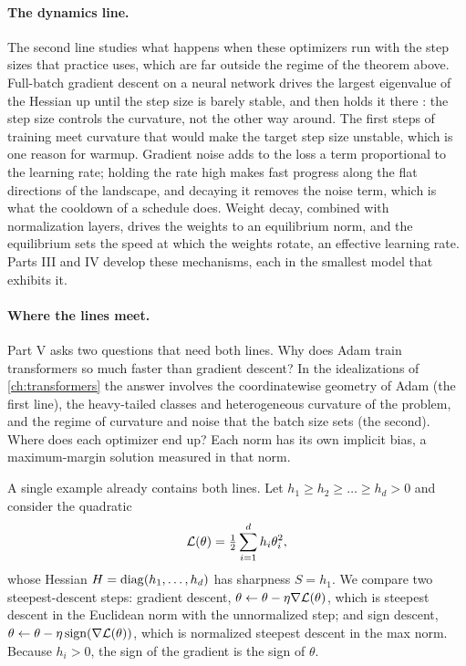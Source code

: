 \begin{refsection}
\paragraph{The dynamics line.} The second line studies what happens when these optimizers run with the step sizes that practice uses, which are far outside the regime of the theorem above. Full-batch gradient descent on a neural network drives the largest eigenvalue of the Hessian up until the step size is barely stable, and then holds it there \parencite{CohenEtAl2021}: the step size controls the curvature, not the other way around. The first steps of training meet curvature that would make the target step size unstable, which is one reason for warmup. Gradient noise adds to the loss a term proportional to the learning rate; holding the rate high makes fast progress along the flat directions of the landscape, and decaying it removes the noise term, which is what the cooldown of a schedule does. Weight decay, combined with normalization layers, drives the weights to an equilibrium norm, and the equilibrium sets the speed at which the weights rotate, an effective learning rate. Parts III and IV develop these mechanisms, each in the smallest model that exhibits it.

\paragraph{Where the lines meet.} Part V asks two questions that need both lines. Why does Adam train transformers so much faster than gradient descent? In the idealizations of \cref{ch:transformers} the answer involves the coordinatewise geometry of Adam (the first line), the heavy-tailed classes and heterogeneous curvature of the problem, and the regime of curvature and noise that the batch size sets (the second). Where does each optimizer end up? Each norm has its own implicit bias, a maximum-margin solution measured in that norm.


A single example already contains both lines. Let $h_1\ge h_2\ge\dots\ge h_d>0$ and consider the quadratic
\[
  \mathcal{L}(\theta)=\tfrac12\sum_{i=1}^dh_i\theta_i^2,
\]
whose Hessian $H=\operatorname{diag}(h_1,\dots,h_d)$ has sharpness $S=h_1$. We compare two steepest-descent steps: gradient descent, $\theta\leftarrow\theta-\eta\nabla\mathcal{L}(\theta)$, which is steepest descent in the Euclidean norm with the unnormalized step; and sign descent, $\theta\leftarrow\theta-\eta\operatorname{sign}(\nabla\mathcal{L}(\theta))$, which is normalized steepest descent in the max norm. Because $h_i>0$, the sign of the gradient is the sign of $\theta$.


\end{refsection}
